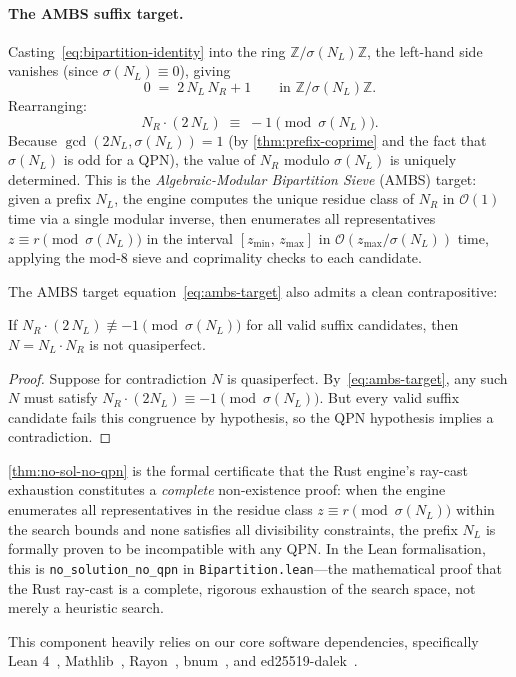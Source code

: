 \paragraph{The AMBS suffix target.}
Casting~\eqref{eq:bipartition-identity} into the ring
$\mathbb{Z}/\sigma(N_L)\mathbb{Z}$, the left-hand side vanishes (since
$\sigma(N_L) \equiv 0$), giving
\[
  0 \;=\; 2\,N_L\,N_R + 1
  \qquad\text{in } \mathbb{Z}/\sigma(N_L)\mathbb{Z}.
\]
Rearranging:
\begin{equation}\label{eq:ambs-target}
  N_R \cdot (2\,N_L) \;\equiv\; -1 \pmod{\sigma(N_L)}.
\end{equation}
Because $\gcd(2 N_L, \sigma(N_L)) = 1$ (by \cref{thm:prefix-coprime} and
the fact that $\sigma(N_L)$ is odd for a QPN), the value of $N_R$ modulo
$\sigma(N_L)$ is uniquely determined.  This is the \emph{Algebraic-Modular
Bipartition Sieve} (AMBS) target: given a prefix $N_L$, the engine computes
the unique residue class of $N_R$ in $\mathcal{O}(1)$ time via a single
modular inverse, then enumerates all representatives
$z \equiv r \pmod{\sigma(N_L)}$ in the interval $[z_{\min},\, z_{\max}]$
in $\mathcal{O}(z_{\max}/\sigma(N_L))$ time, applying the mod-8 sieve
and coprimality checks to each candidate.

The AMBS target equation~\eqref{eq:ambs-target} also admits a clean
contrapositive:

\begin{theorem}\label{thm:no-sol-no-qpn}
If $N_R \cdot (2\,N_L) \not\equiv -1 \pmod{\sigma(N_L)}$ for all
valid suffix candidates, then $N = N_L \cdot N_R$ is not quasiperfect.
\end{theorem}

\begin{proof}
Suppose for contradiction $N$ is quasiperfect.
By~\eqref{eq:ambs-target}, any such $N$ must satisfy
$N_R \cdot (2N_L) \equiv -1 \pmod{\sigma(N_L)}$.
But every valid suffix candidate fails this congruence by hypothesis,
so the QPN hypothesis implies a contradiction.
\end{proof}

\cref{thm:no-sol-no-qpn} is the formal certificate that the Rust engine's
ray-cast exhaustion constitutes a {\em complete} non-existence proof:
when the engine enumerates all representatives in the residue class
$z \equiv r \pmod{\sigma(N_L)}$ within the search bounds and none
satisfies all divisibility constraints, the prefix $N_L$ is formally
proven to be incompatible with any QPN\@.  In the Lean formalisation,
this is
\texttt{no\_\allowbreak{}solution\_\allowbreak{}no\_\allowbreak{}qpn}
in \texttt{Bipartition.lean}---the mathematical proof that the Rust
ray-cast is a complete, rigorous exhaustion of the search space, not
merely a heuristic search.



This component heavily relies on our core software dependencies, specifically Lean 4~\cite{moura2021}, Mathlib~\cite{mathlib2020}, Rayon~\cite{rayon2024}, bnum~\cite{bnum2024}, and ed25519-dalek~\cite{ed25519dalek2024}.
